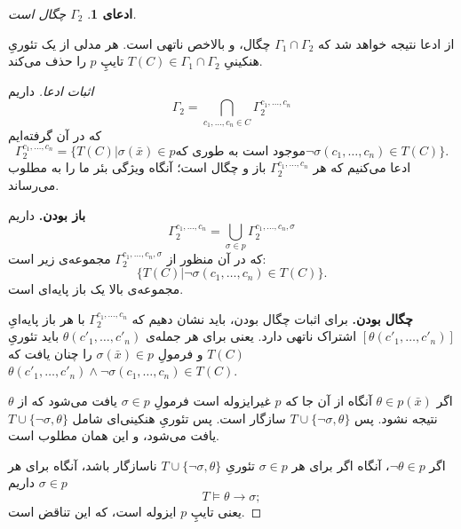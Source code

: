 \documentclass[12pt,a4paper]{report}
\theoremstyle{colorhead}
\newtheorem{claim}[thm]{ادعای}
\begin{document}
\begin{claim}
$\Gamma_2$
چگال است.
\end{claim}
از ادعا نتیجه خواهد شد که 
$\Gamma_1\cap \Gamma_2$
چگال، و بالاخص ناتهی است. هر مدلی از 
یک تئوریِ هنکینیِ
$T(C)\in \Gamma_1\cap \Gamma_2$
تایپِ 
$p$
را حذف می‌کند. 
\begin{proof}[اثبات ادعا]
داریم
\[
\Gamma_2=\bigcap_{c_1,\ldots,c_n\in C} \Gamma_2^{c_1,\ldots,c_n}
\]
که در آن گرفته‌ایم
\[
\Gamma_2^{c_1,\ldots,c_n}=\{T(C)|
\text{$\sigma(\bar{x})\in p$
موجود است به  طوری که
$\neg \sigma(c_1,\ldots,c_n)\in T(C)$
}\}.
\]
ادعا می‌کنیم که هر
$\Gamma_2^{c_1,\ldots,c_n}$
باز و چگال است؛ آنگاه ویژگی بئر ما را به مطلوب می‌رساند.
\par 
\noindent
\textbf{باز بودن.}
داریم
\[
\Gamma_2^{c_1,\ldots,c_n}=\bigcup_{\sigma\in p}
\Gamma_2^{c_1,\ldots,c_n, \sigma}
\]
که در آن
منظور
از
$\Gamma_2^{c_1,\ldots,c_n, \sigma}$
مجموعه‌ی زیر است:
\[
\{T(C)|\neg \sigma(c_1,\ldots,c_n)\in T(C)\}.
\]
مجموعه‌ی بالا یک باز پایه‌ای است. 
\par \noindent
\textbf{چگال بودن.}
برای اثبات چگال بودن،‌ باید نشان دهیم که 
$\Gamma_2^{c_1,\ldots,c_n}$
با هر باز پایه‌ایِ
$[\theta(c'_1,\ldots,c'_n)]$
اشتراک ناتهی دارد.  یعنی برای هر جمله‌ی 
$\theta(c'_1,\ldots,c'_n)$
باید تئوریِ
$T(C)$
و فرمولِ
$\sigma(\bar{x})\in p$
را چنان یافت که
$\theta(c'_1,\ldots,c'_n)\wedge \neg \sigma(c_1,\ldots,c_n)\in T(C)$.
\par 
اگر 
$\theta\in p(\bar{x})$
آنگاه از آن جا که
$p$
غیرایزوله است فرمولِ
$\sigma\in p$
یافت می‌شود که از
$\theta$
نتیجه نشود. پس
$T\cup \{\neg \sigma,\theta\}$
سازگار است. پس تئوریِ هنکینی‌ای شامل
$T\cup \{\neg \sigma,\theta\}$
یافت می‌شود، و این همان مطلوب است.
\par 
اگر
$\neg\theta\in p$، 
آنگاه
اگر برای هر
$\sigma\in p$
تئوریِ
$T\cup \{\neg \sigma,\theta\}$
ناسازگار باشد،‌ آنگاه برای هر
$\sigma\in p$
داریم
\[
T\models \theta\to \sigma;
\]
یعنی تایپِ 
$p$
ایزوله است، که این تناقض است. 
\end{proof}
\pagebreak 
\end{document}

